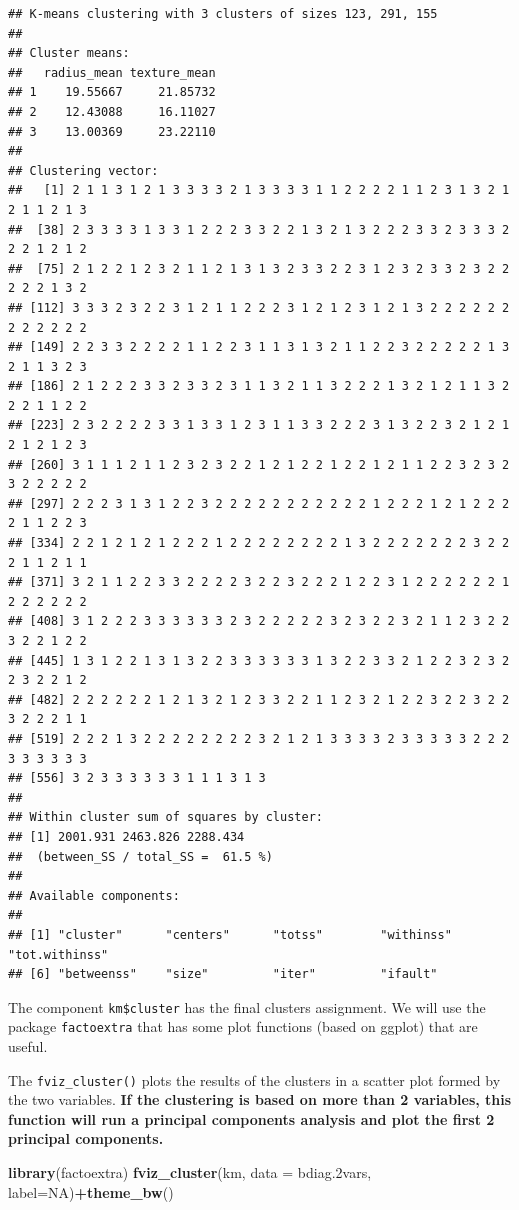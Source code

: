 \documentclass[
]{book}
\newenvironment{Shaded}{\begin{snugshade}}{\end{snugshade}}
\newcommand{\AttributeTok}[1]{\textcolor[rgb]{0.13,0.29,0.53}{#1}}
\newcommand{\ConstantTok}[1]{\textcolor[rgb]{0.56,0.35,0.01}{#1}}
\newcommand{\FloatTok}[1]{\textcolor[rgb]{0.00,0.00,0.81}{#1}}
\newcommand{\FunctionTok}[1]{\textcolor[rgb]{0.13,0.29,0.53}{\textbf{#1}}}
\newcommand{\NormalTok}[1]{#1}
\newcommand{\SpecialCharTok}[1]{\textcolor[rgb]{0.81,0.36,0.00}{\textbf{#1}}}
\begin{document}
\begin{verbatim}
## K-means clustering with 3 clusters of sizes 123, 291, 155
## 
## Cluster means:
##   radius_mean texture_mean
## 1    19.55667     21.85732
## 2    12.43088     16.11027
## 3    13.00369     23.22110
## 
## Clustering vector:
##   [1] 2 1 1 3 1 2 1 3 3 3 3 2 1 3 3 3 3 1 1 2 2 2 2 1 1 2 3 1 3 2 1 2 1 1 2 1 3
##  [38] 2 3 3 3 3 1 3 3 1 2 2 2 3 3 2 2 1 3 2 1 3 2 2 2 3 3 2 3 3 3 2 2 2 1 2 1 2
##  [75] 2 1 2 2 1 2 3 2 1 1 2 1 3 1 3 2 3 3 2 2 3 1 2 3 2 3 3 2 3 2 2 2 2 2 1 3 2
## [112] 3 3 3 2 3 2 2 3 1 2 1 1 2 2 2 3 1 2 1 2 3 1 2 1 3 2 2 2 2 2 2 2 2 2 2 2 2
## [149] 2 2 3 3 2 2 2 2 1 1 2 2 3 1 1 3 1 3 2 1 1 2 2 3 2 2 2 2 2 1 3 2 1 1 3 2 3
## [186] 2 1 2 2 2 3 3 2 3 3 2 3 1 1 3 2 1 1 3 2 2 2 1 3 2 1 2 1 1 3 2 2 2 1 1 2 2
## [223] 2 3 2 2 2 2 3 3 1 3 3 1 2 3 1 1 3 3 2 2 2 3 1 3 2 2 3 2 1 2 1 2 1 2 1 2 3
## [260] 3 1 1 1 2 1 1 2 3 2 3 2 2 1 2 1 2 2 1 2 2 1 2 1 1 2 2 3 2 3 2 3 2 2 2 2 2
## [297] 2 2 2 3 1 3 1 2 2 3 2 2 2 2 2 2 2 2 2 2 2 1 2 2 2 1 2 1 2 2 2 2 1 1 2 2 3
## [334] 2 2 1 2 1 2 1 2 2 2 1 2 2 2 2 2 2 2 2 1 3 2 2 2 2 2 2 2 3 2 2 2 1 1 2 1 1
## [371] 3 2 1 1 2 2 3 3 2 2 2 2 3 2 2 3 2 2 2 1 2 2 3 1 2 2 2 2 2 2 1 2 2 2 2 2 2
## [408] 3 1 2 2 2 3 3 3 3 3 3 2 3 2 2 2 2 2 3 2 3 2 2 3 2 1 1 2 3 2 2 3 2 2 1 2 2
## [445] 1 3 1 2 2 1 3 1 3 2 2 3 3 3 3 3 3 1 3 2 2 3 3 2 1 2 2 3 2 3 2 2 3 2 2 1 2
## [482] 2 2 2 2 2 2 1 2 1 3 2 1 2 3 3 2 2 1 1 2 3 2 1 2 2 3 2 2 3 2 2 3 2 2 2 1 1
## [519] 2 2 2 1 3 2 2 2 2 2 2 2 2 3 2 1 2 1 3 3 3 3 2 3 3 3 3 3 2 2 2 3 3 3 3 3 3
## [556] 3 2 3 3 3 3 3 3 1 1 1 3 1 3
## 
## Within cluster sum of squares by cluster:
## [1] 2001.931 2463.826 2288.434
##  (between_SS / total_SS =  61.5 %)
## 
## Available components:
## 
## [1] "cluster"      "centers"      "totss"        "withinss"     "tot.withinss"
## [6] "betweenss"    "size"         "iter"         "ifault"
\end{verbatim}

The component \texttt{km\$cluster} has the final clusters assignment. We will use the
package \texttt{factoextra} that has some plot functions (based on ggplot) that are
useful.

The \texttt{fviz\_cluster()} plots the results of the clusters in a scatter plot
formed by the two variables. \textbf{If the clustering is based on more than 2
variables, this function will run a principal components analysis and plot
the first 2 principal components.}

\begin{Shaded}
\begin{Highlighting}[]
\FunctionTok{library}\NormalTok{(factoextra)}
\FunctionTok{fviz\_cluster}\NormalTok{(km, }\AttributeTok{data =}\NormalTok{ bdiag}\FloatTok{.2}\NormalTok{vars, }\AttributeTok{label=}\ConstantTok{NA}\NormalTok{)}\SpecialCharTok{+}\FunctionTok{theme\_bw}\NormalTok{()}
\end{Highlighting}
\end{Shaded}
\end{document}
